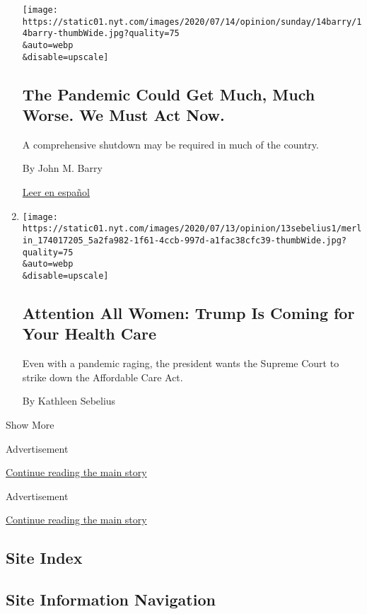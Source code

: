 \begin{enumerate}
  \texttt{[image: https://static01.nyt.com/images/2020/07/14/opinion/sunday/14barry/14barry-thumbWide.jpg?quality=75\\\&auto=webp\\\&disable=upscale]}

  \hypertarget{the-pandemic-could-get-much-much-worse-we-must-act-now}{%
  \subsection{The Pandemic Could Get Much, Much Worse. We Must Act
  Now.}\label{the-pandemic-could-get-much-much-worse-we-must-act-now}}

  A comprehensive shutdown may be required in much of the country.

  By John M. Barry

  \href{https://www.nytimes.com/es/2020/07/16/espanol/opinion/coronavirus-cuarentena.html}{Leer
  en español}
\item
  \href{/2020/07/13/opinion/obamacare-aca-trump-women.html}{}

  \texttt{[image: https://static01.nyt.com/images/2020/07/13/opinion/13sebelius1/merlin\_174017205\_5a2fa982-1f61-4ccb-997d-a1fac38cfc39-thumbWide.jpg?quality=75\\\&auto=webp\\\&disable=upscale]}

  \hypertarget{attention-all-women-trump-is-coming-for-your-health-care}{%
  \subsection{Attention All Women: Trump Is Coming for Your Health
  Care}\label{attention-all-women-trump-is-coming-for-your-health-care}}

  Even with a pandemic raging, the president wants the Supreme Court to
  strike down the Affordable Care Act.

  By Kathleen Sebelius
\end{enumerate}

Show More

Advertisement

\protect\hyperlink{after-mid2}{Continue reading the main story}

Advertisement

\protect\hyperlink{after-mktg}{Continue reading the main story}

\hypertarget{site-index}{%
\subsection{Site Index}\label{site-index}}

\hypertarget{site-information-navigation}{%
\subsection{Site Information
Navigation}\label{site-information-navigation}}

